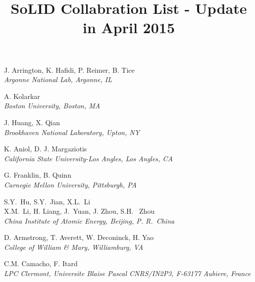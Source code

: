 \documentclass[12pt]{article}
\begin{document}
\title{SoLID Collabration List - Update in April 2015}  
\maketitle 

\begin{center}
\large{J. Arrington, K. Hafidi, P. Reimer, B. Tice} \\
\it{Argonne National Lab, Argonne, IL}
\end{center}

\begin{center}
\large{A. Kolarkar} \\
\it{Boston University, Boston, MA}
\end{center}

\begin{center}
\large{J. Huang, X. Qian} \\
\it{Brookhaven National Laboratory, Upton, NY}
\end{center}

\begin{center}
\large {K. Aniol, D. J. Margaziotis}\\
\it{California State University-Los Angles, Los Angles, CA}
\end{center}

\begin{center}
\large {G. Franklin, B. Quinn}\\
\it{Carnegie Mellon University, Pittsburgh, PA}
\end{center}

\begin{center}
\large {S.Y.~Hu, S.Y.~Jian, X.L.~Li \\  X.M.~Li, H. Liang,
J.~Yuan, J. Zhou, S.H. ~Zhou}\\
\it{China Institute of Atomic Energy, Beijing, P. R.~China}
\end{center}

\begin{center}
\large{D. Armstrong, T. Averett, W. Deconinck, H. Yao}\\
\it{College of William \& Mary, Williamburg, VA}
\end{center}

\begin{center}
\large{C.M. Camacho, F. Itard}\\
\it{LPC Clermont, Universite Blaise Pascal CNRS/IN2P3, F-63177 Aubiere, France}
\end{center}
\end{document}
